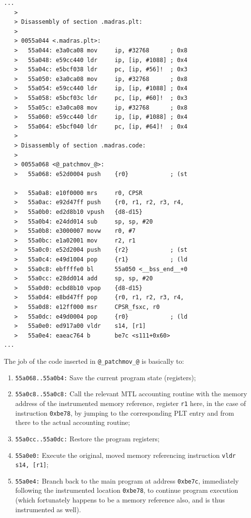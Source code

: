 \documentclass[11pt, a4paper, twoside]{montblanc2}
\begin{document}
\begin{footnotesize}
\begin{verbatim}
...
   >
   > Disassembly of section .madras.plt:
   >
   > 0055a044 <.madras.plt>:
   >   55a044: e3a0ca08 mov     ip, #32768      ; 0x8
   >   55a048: e59cc440 ldr     ip, [ip, #1088] ; 0x4
   >   55a04c: e5bcf038 ldr     pc, [ip, #56]!  ; 0x3
   >   55a050: e3a0ca08 mov     ip, #32768      ; 0x8
   >   55a054: e59cc440 ldr     ip, [ip, #1088] ; 0x4
   >   55a058: e5bcf03c ldr     pc, [ip, #60]!  ; 0x3
   >   55a05c: e3a0ca08 mov     ip, #32768      ; 0x8
   >   55a060: e59cc440 ldr     ip, [ip, #1088] ; 0x4
   >   55a064: e5bcf040 ldr     pc, [ip, #64]!  ; 0x4
   >
   > Disassembly of section .madras.code:
   >
   > 0055a068 <@_patchmov_@>:
   >   55a068: e52d0004 push    {r0}            ; (st

   >   55a0a8: e10f0000 mrs     r0, CPSR
   >   55a0ac: e92d47ff push    {r0, r1, r2, r3, r4, 
   >   55a0b0: ed2d8b10 vpush   {d8-d15}
   >   55a0b4: e24dd014 sub     sp, sp, #20
   >   55a0b8: e3000007 movw    r0, #7
   >   55a0bc: e1a02001 mov     r2, r1
   >   55a0c0: e52d2004 push    {r2}            ; (st
   >   55a0c4: e49d1004 pop     {r1}            ; (ld
   >   55a0c8: ebffffe0 bl      55a050 <__bss_end__+0
   >   55a0cc: e28dd014 add     sp, sp, #20
   >   55a0d0: ecbd8b10 vpop    {d8-d15}
   >   55a0d4: e8bd47ff pop     {r0, r1, r2, r3, r4, 
   >   55a0d8: e12ff000 msr     CPSR_fsxc, r0
   >   55a0dc: e49d0004 pop     {r0}            ; (ld
   >   55a0e0: ed917a00 vldr    s14, [r1]
   >   55a0e4: eaeac764 b       be7c <s111+0x60>
...
\end{verbatim}
\end{footnotesize}

The job of the code inserted in \verb|@_patchmov_@| is basically to:
\begin{enumerate}
\item \texttt{55a068..55a0b4:} Save the current program state (registers);
\item \texttt{55a0c8..55a0c8:} Call the relevant MTL accounting routine with the 
memory address of the instrumented memory reference, register \texttt{r1} here, 
in the case of instruction \texttt{0xbe78}, by jumping to the corresponding PLT 
entry and from there to the actual accounting routine;
\item \texttt{55a0cc..55a0dc:} Restore the program registers;
\item \texttt{55a0e0:} Execute the original, moved memory referencing 
instruction \verb|vldr s14, [r1]|;
\item \texttt{55a0e4:} Branch back to the main program at address 
  \texttt{0xbe7c}, immediately following the instrumented location 
  \texttt{0xbe78}, to continue program execution (which fortunately happens to 
  be a memory reference also, and is thus instrumented as well).
\end{enumerate}
\end{document}
